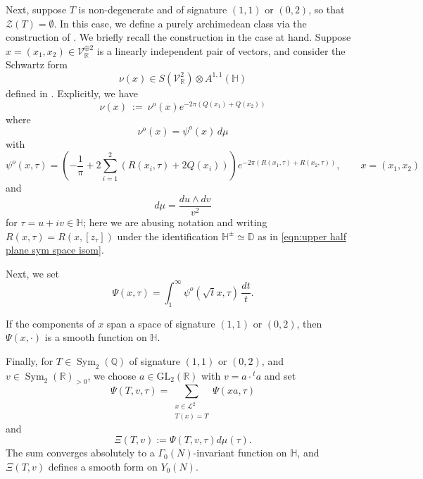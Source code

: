 \documentclass[reqno,oneside]{amsart}
\theoremstyle{plain}
\theoremstyle{remark}
\numberwithin{theorem}{section}
\newcommand{\bbD}{\mathbb D}
\newcommand{\bbH}{\mathbb H}
\newcommand{\bbQ}{\mathbb Q}
\newcommand{\bbR}{\mathbb R}
\newcommand{\calL}{\mathcal L}
\newcommand{\calV}{\mathcal V}
\newcommand{\calZ}{\mathcal Z}
\DeclareMathOperator{\Sym}{Sym}
\newcommand{\GL}{\mathrm{GL}}
\begin{document}
	Next, suppose $T$ is non-degenerate and of signature $(1,1)$ or $(0,2)$, so that $\calZ(T) = \emptyset$. In this case, we define a purely archimedean class via the construction of \cite{GarciaSankaran}. We briefly recall the construction in the case at hand.
	Suppose $x = (x_1, x_2) \in \calV_{\bbR}^{\oplus 2}$ is a linearly independent pair of vectors, and consider the Schwartz form
	\begin{equation}
	\nu(x)  \in S(\calV_{\bbR}^2) \otimes A^{1,1}(\bbH)
	\end{equation}
	defined in \cite{GarciaSankaran}. Explicitly, we have
	\begin{equation}
	\nu (x) \ := \ \nu^o(x) e^{- 2 \pi (Q(x_1 )+ Q(x_2))}
	\end{equation}
	where
	\begin{equation}
	\nu^o(x) = \psi^o(x) \, d \mu
	\end{equation}
	with
	\begin{equation} \label{eq:psi0}
	\psi^o(x,\tau) =  \left(- \frac{1}{\pi} +  2 \sum_{i =1}^2( R(x_i,\tau) + 2 Q(x_i)) \right) e^{-2\pi (R(x_1, \tau) + R(x_2, \tau))}, \qquad x= (x_1, x_2)
	\end{equation}
	and
	\begin{equation}
	d \mu = \frac{du \wedge dv}{v^2}
	\end{equation}
	for $\tau = u + i v \in \bbH$; here we are abusing notation and writing $R(x, \tau) = R(x, [z_{\tau}])$ under the identification $\bbH^{\pm} \simeq \bbD$ as in \eqref{eqn:upper half plane sym space isom}.
	
	Next, we set
	\begin{equation}
	\Psi(x,\tau) = \int_1^{\infty}  \psi^o( \sqrt{t} x,\tau) \, \frac{dt}{t}.
	\end{equation}

	If the components of $x$ span a space of signature $(1,1)$ or $(0,2)$, then $\Psi(x, \cdot )$ is a smooth  function on $\mathbb H$.
	
	Finally, for $T \in \Sym_2(\bbQ)$ of signature $(1,1)$ or $(0,2)$, and $v \in \Sym_2(\bbR)_{>0}$, we choose  $a \in \GL_2(\bbR)$ with $v = a \cdot {}^t a$ and set
	\begin{equation}
	\Psi(T,v,\tau) = \sum_{\substack{ x \in \calL^2 \\ T(x) = T}} \Psi(xa,\tau)
	\end{equation}	
	and
	\begin{equation} \label{eqn:Green current indefinite case}
	\Xi(T,v) :=  \Psi(T,v,\tau) d\mu(\tau) .
	\end{equation}
	The sum converges absolutely to a  $\Gamma_0(N)$-invariant function on $\bbH$, and $\Xi(T,v)$ defines a smooth form on $Y_0(N)$.
	
\end{document}
